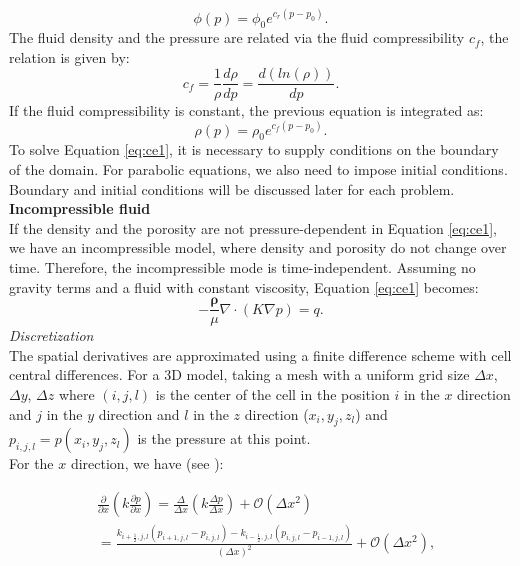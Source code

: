 \documentclass[a4paper,10pt]{report}
\begin{document}
\begin{equation}\label{eq:por}
 \phi(p)=\phi_0 e^{c_r(p-p_0)}.
\end{equation}
The fluid density and the pressure are related via the fluid compressibility $c_f$, the relation is given by:
\begin{equation*}\label{eq:fc}
 c_f=\frac{1}{\rho}\frac{d\rho}{dp}=\frac{d(ln(\rho))}{dp}.
\end{equation*}
If the fluid compressibility is constant, the previous equation is integrated as:
\begin{equation}\label{eq:rhoeq}
 \rho(p)=\rho_0 e^{c_f({p}-{p}_0)}.
\end{equation}
To solve Equation \eqref{eq:ce1}, it is necessary to supply conditions on the boundary of the domain. For parabolic equations, we also need to impose initial conditions. Boundary and initial conditions will be discussed later for each problem.   \\
\textbf{Incompressible fluid}\\
If the density and the porosity are not pressure-dependent in Equation \eqref{eq:ce1}, we have an incompressible model, where density and porosity do not change over time. Therefore, the incompressible mode is time-independent. Assuming no gravity terms and a fluid with constant viscosity, Equation \eqref{eq:ce1} becomes:
\begin{equation}\label{eq:cel}
-\frac{\mathbf{\rho}}{\mu}\nabla \cdot \left({K} \nabla p\right)=q.
\end{equation}
\emph{Discretization}\\
The spatial derivatives are approximated using a finite difference scheme with cell central 
differences. For a 3D model, taking a mesh with a uniform grid size $\Delta x$, $\Delta y$, $\Delta z$ where $(i,j,l)$ is the center 
of the cell
in the position $i$ in the $x$ direction and $j$ in the $y$ direction and $l$ in the $z$ direction
($x_i,y_j,z_l$) and $p_{i,j,l}=p(x_i,y_j,z_l)$ is 
the pressure at this point.
\\ For the $x$ direction, we have (see \cite{Jansen13}):

\begin{align*}
&\frac{\partial}{\partial x}\left(k\frac{\partial p}{\partial x}\right) = 
\frac{\Delta }{\Delta x}\left(k\frac{\Delta p}{\Delta x}\right) +\mathcal{O}(\Delta x^2)\\
&=\frac{ k_{i+\frac{1}{2},j,l}(p_{i+1,j,l}-p_{i,j,l})-k_{i-\frac{1}{2},j,l}(p_{i,j,l}-p_{i-1,j,l})}{\left( \Delta x\right)^2}+\mathcal{O}(\Delta x^2),\\
\end{align*}
\end{document}
